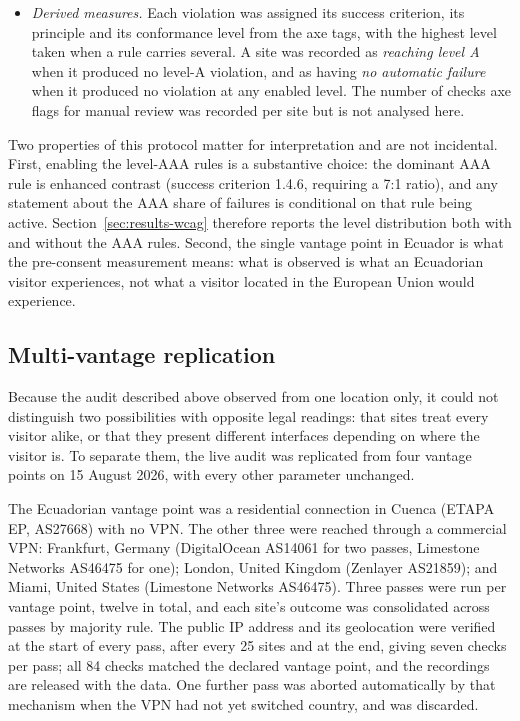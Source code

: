 \documentclass[pdflatex,sn-basic,Numbered]{sn-jnl}
\theoremstyle{thmstyleone}
\theoremstyle{thmstyletwo}
\theoremstyle{thmstylethree}
\begin{document}
\begin{itemize}
	\item \emph{Derived measures.} Each violation was assigned its success criterion, its principle and its conformance level from the axe tags, with the highest level taken when a rule carries several. A site was recorded as \emph{reaching level A} when it produced no level-A violation, and as having \emph{no automatic failure} when it produced no violation at any enabled level. The number of checks axe flags for manual review was recorded per site but is not analysed here.
\end{itemize}

Two properties of this protocol matter for interpretation and are not incidental. First, enabling the level-AAA rules is a substantive choice: the dominant AAA rule is enhanced contrast (success criterion 1.4.6, requiring a 7:1 ratio), and any statement about the AAA share of failures is conditional on that rule being active. Section~\ref{sec:results-wcag} therefore reports the level distribution both with and without the AAA rules. Second, the single vantage point in Ecuador is what the pre-consent measurement means: what is observed is what an Ecuadorian visitor experiences, not what a visitor located in the European Union would experience.

\subsection{Multi-vantage replication}\label{sec:methods-vantage}

Because the audit described above observed from one location only, it could not distinguish two possibilities with opposite legal readings: that sites treat every visitor alike, or that they present different interfaces depending on where the visitor is. To separate them, the live audit was replicated from four vantage points on 15 August 2026, with every other parameter unchanged.

The Ecuadorian vantage point was a residential connection in Cuenca (ETAPA EP, AS27668) with no VPN. The other three were reached through a commercial VPN: Frankfurt, Germany (DigitalOcean AS14061 for two passes, Limestone Networks AS46475 for one); London, United Kingdom (Zenlayer AS21859); and Miami, United States (Limestone Networks AS46475). Three passes were run per vantage point, twelve in total, and each site's outcome was consolidated across passes by majority rule. The public IP address and its geolocation were verified at the start of every pass, after every 25 sites and at the end, giving seven checks per pass; all 84 checks matched the declared vantage point, and the recordings are released with the data. One further pass was aborted automatically by that mechanism when the VPN had not yet switched country, and was discarded.
\end{document}
